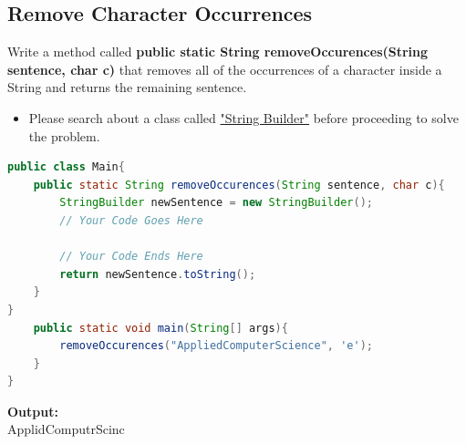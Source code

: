 \documentclass[12pt , a4paper]{article}
\begin{document}
	\newpage
	\subsection{Remove Character Occurrences}
Write a method called \textbf{public static String removeOccurences(String sentence, char c)} that removes all of the occurrences of a character inside a String and returns the remaining sentence.\\

	\begin{importantBox}

		\begin{itemize}
			\item Please search about a class called \href{https://docs.oracle.com/javase/tutorial/java/data/buffers.html}{"String Builder"} before proceeding to solve the problem.  
		\end{itemize}
	\end{importantBox}

	\begin{lstlisting}[language=Java]
public class Main{
	public static String removeOccurences(String sentence, char c){
		StringBuilder newSentence = new StringBuilder();
		// Your Code Goes Here

		// Your Code Ends Here	
		return newSentence.toString();
	}
}
	public static void main(String[] args){
		removeOccurences("AppliedComputerScience", 'e');
	}
}
	\end{lstlisting}


	\begin{tcolorbox}
	\textbf{Output:}\\
	ApplidComputrScinc
	\end{tcolorbox}




	\newpage
\end{document}

